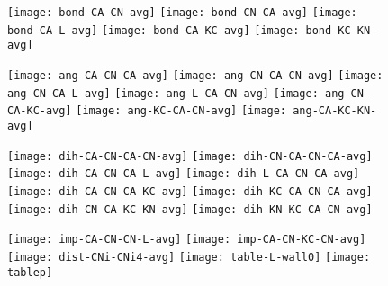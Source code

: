 \documentclass{article}
\begin{document}
\begin{figure}
  \begin{center}
    \begin{minipage}[t]{1.0\textwidth}
      \texttt{[image: bond-CA-CN-avg]}
      \texttt{[image: bond-CN-CA-avg]}
      \texttt{[image: bond-CA-L-avg]}
      \texttt{[image: bond-CA-KC-avg]}
      \texttt{[image: bond-KC-KN-avg]}
    \end{minipage}
  \end{center}
\end{figure}

\begin{figure}
  \begin{center}
    \begin{minipage}[t]{1.0\textwidth}
      \texttt{[image: ang-CA-CN-CA-avg]}
      \texttt{[image: ang-CN-CA-CN-avg]}
      \texttt{[image: ang-CN-CA-L-avg]}
      \texttt{[image: ang-L-CA-CN-avg]}
      \texttt{[image: ang-CN-CA-KC-avg]}
      \texttt{[image: ang-KC-CA-CN-avg]}
      \texttt{[image: ang-CA-KC-KN-avg]}
    \end{minipage}
  \end{center}
\end{figure}

\begin{figure}
  \begin{center}
    \begin{minipage}[t]{1.0\textwidth}
      \texttt{[image: dih-CA-CN-CA-CN-avg]}
      \texttt{[image: dih-CN-CA-CN-CA-avg]}
      \texttt{[image: dih-CA-CN-CA-L-avg]}
      \texttt{[image: dih-L-CA-CN-CA-avg]}
      \texttt{[image: dih-CA-CN-CA-KC-avg]}
      \texttt{[image: dih-KC-CA-CN-CA-avg]}
      \texttt{[image: dih-CN-CA-KC-KN-avg]}
      \texttt{[image: dih-KN-KC-CA-CN-avg]}
    \end{minipage}
  \end{center}
\end{figure}

\begin{figure}
  \begin{center}
    \begin{minipage}[t]{1.0\textwidth}
      \texttt{[image: imp-CA-CN-CN-L-avg]}
      \texttt{[image: imp-CA-CN-KC-CN-avg]}
      \texttt{[image: dist-CNi-CNi4-avg]}
      \texttt{[image: table-L-wall0]}
      \texttt{[image: tablep]}
    \end{minipage}
  \end{center}
\end{figure}
\end{document}
